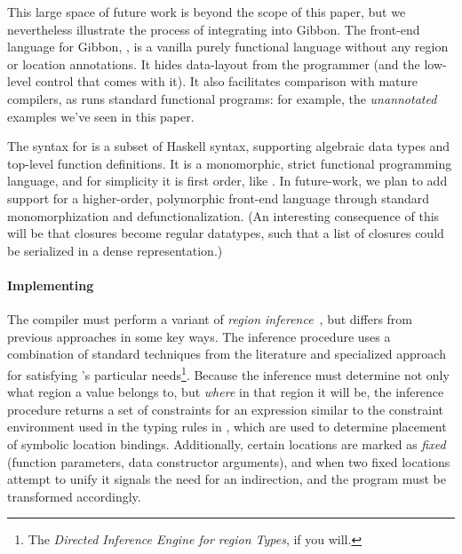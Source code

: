 \documentclass[showabstract,showacknowledgments,showpreface,showdedication]{iuphd}
\theoremstyle{nonumberplain}
\newcommand{\il}[1]{\lstinline[style=inline,mathescape=true];#1;}
\begin{document}
This large space of future work is beyond the scope of this paper, but we nevertheless
illustrate the process of
integrating \ourcalc into Gibbon.
%
The front-end language for Gibbon, \lamadt, is a vanilla purely functional
language without any region or location
annotations.  It hides data-layout from the programmer (and the low-level
control that comes with it).  It also facilitates comparison with 
mature compilers, as \lamadt runs standard functional programs:
for example, the {\em unannotated} examples we've seen in this paper.

{The syntax for \lamadt is a subset of Haskell syntax, supporting
  algebraic data types and top-level function definitions. It is a
  monomorphic, strict functional programming language, and for
  simplicity it is first order, like \ourcalc.}
{In future-work, we plan to add support for a higher-order, polymorphic
  front-end language through standard monomorphization and defunctionalization.
  (An interesting consequence of this will be that closures become regular
  datatypes, such that a list of closures could be serialized in a dense
  representation.)}

%

\paragraph{Implementing \lamadt}
The compiler must perform a variant of {\em region
  inference}~\cite{regioncalcs,mlkit-retrospective}, but differs from
previous approaches in some key ways.
%
The inference procedure uses a combination of standard techniques from the literature and specialized
approach for satisfying \ourcalc's particular needs\footnote{The {\em
    Directed Inference Engine for region Types}, if you will.}.
%
Because the inference must determine
not only what region a value belongs to, but \emph{where} in that region it will
be, the inference procedure returns a set of constraints for an expression similar to the
constraint environment used in the typing rules in , which are
used to determine placement of symbolic location bindings. Additionally, certain locations
are marked as \emph{fixed} (function parameters, data constructor arguments), and when two
fixed locations attempt to unify it signals the need for an indirection, and the
program must be transformed accordingly.
\end{document}
